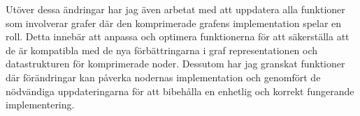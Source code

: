 Utöver dessa ändringar har jag även arbetat med att uppdatera alla funktioner som involverar grafer där den komprimerade grafens 
implementation spelar en roll. Detta innebär att anpassa och optimera funktionerna för att säkerställa att de är kompatibla med 
de nya förbättringarna i graf representationen och datastrukturen för komprimerade noder. Dessutom har jag granskat funktioner där 
förändringar kan påverka nodernas implementation och genomfört de nödvändiga uppdateringarna för att bibehålla en enhetlig och 
korrekt fungerande implementering.

